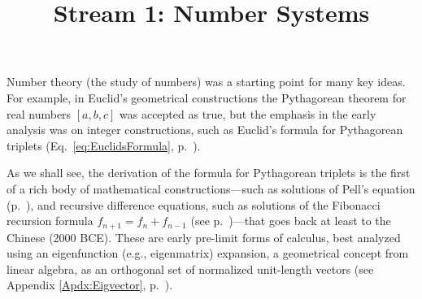 \documentclass{ximera}
\title  %
	{Stream 1: Number Systems}
\begin{document}
\begin{abstract}
\end{abstract}
\maketitle
\label{Chap:NS} \label{Sect:NS}

Number theory (the study of numbers) was a starting point for many key ideas.
For example, in Euclid's geometrical constructions the Pythagorean theorem for real numbers $[a,b,c]$ was accepted as true,
but the emphasis in the early analysis was on integer constructions, such as Euclid's formula for Pythagorean triplets (Eq.~\ref{eq:EuclidsFormula}, p.~\pageref{eq:EuclidsFormula}).

As we shall see, the derivation of the formula for Pythagorean triplets is the first of a rich body of
mathematical constructions---such as solutions of Pell's equation (p.~\pageref{Lec 8}),%
and recursive difference equations, such as solutions of the Fibonacci recursion formula
$f_{n+1} = f_n + f_{n-1}$ (see p.~\pageref{Lec 9})---that goes back at least to the Chinese (2000 BCE).
These are early pre-limit forms of calculus, best analyzed using an eigenfunction
(e.g., eigenmatrix) expansion, a geometrical concept from linear algebra, as an orthogonal set of
normalized unit-length vectors (see Appendix \ref{Apdx:Eigvector}, p.~\pageref{Apdx:Eigvector}).

\end{document}
